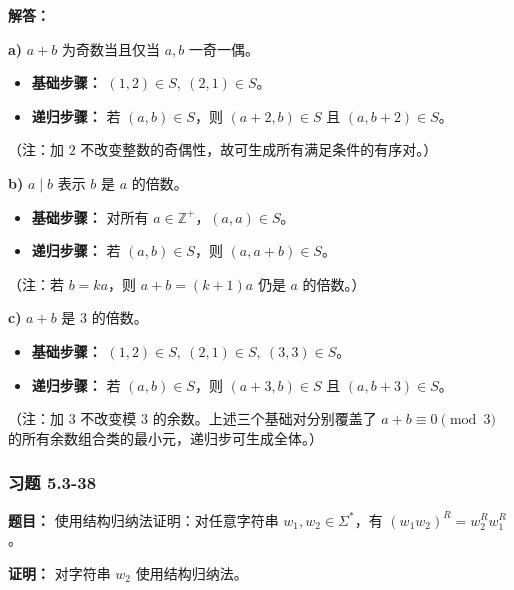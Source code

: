 \documentclass[11pt,UTF8]{article}
\begin{document}
\textbf{解答：}

\textbf{a)} $a+b$ 为奇数当且仅当 $a,b$ 一奇一偶。
\begin{itemize}
    \item \textbf{基础步骤：} $(1,2) \in S,\ (2,1) \in S$。
    \item \textbf{递归步骤：} 若 $(a,b) \in S$，则 $(a+2, b) \in S$ 且 $(a, b+2) \in S$。
\end{itemize}
（注：加 $2$ 不改变整数的奇偶性，故可生成所有满足条件的有序对。）

\textbf{b)} $a \mid b$ 表示 $b$ 是 $a$ 的倍数。
\begin{itemize}
    \item \textbf{基础步骤：} 对所有 $a \in \mathbb{Z}^+$，$(a,a) \in S$。
    \item \textbf{递归步骤：} 若 $(a,b) \in S$，则 $(a, a+b) \in S$。
\end{itemize}
（注：若 $b = ka$，则 $a+b = (k+1)a$ 仍是 $a$ 的倍数。）

\textbf{c)} $a+b$ 是 $3$ 的倍数。
\begin{itemize}
    \item \textbf{基础步骤：} $(1,2) \in S,\ (2,1) \in S,\ (3,3) \in S$。
    \item \textbf{递归步骤：} 若 $(a,b) \in S$，则 $(a+3, b) \in S$ 且 $(a, b+3) \in S$。
\end{itemize}
（注：加 $3$ 不改变模 $3$ 的余数。上述三个基础对分别覆盖了 $a+b \equiv 0 \pmod 3$ 的所有余数组合类的最小元，递归步可生成全体。）

\subsubsection*{习题 5.3-38}
\textbf{题目：} 使用结构归纳法证明：对任意字符串 $w_1, w_2 \in \Sigma^*$，有 $(w_1 w_2)^R = w_2^R w_1^R$。

\textbf{证明：} 对字符串 $w_2$ 使用结构归纳法。
\end{document}
